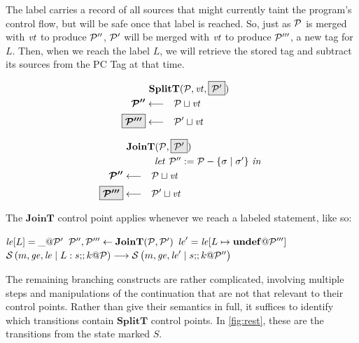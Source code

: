 \documentclass{article}
\begin{document}
The label carries a record of all sources that might currently taint the program's
control flow, but will be safe once that label is reached. So, just as \(\mathcal{P}\) is merged with
\(\mathit{vt}\) to produce \(\mathcal{P}''\), \(\mathcal{P}'\) will be merged with \(\mathit{vt}\) to produce \(\mathcal{P}'''\), a new tag
for \(L\). Then, when we reach the label \(L\), we will retrieve the stored tag and subtract its
sources from the PC Tag at that time.

\begin{minipage}{.4\textwidth}
\[\begin{aligned}
\truledef{\splitt{\PCT}{\vt}{\optional{\(\PCT'\)}}}
\settag{\PCT''}{\PCT \sqcup \vt}
\settag{\optional{\(\PCT'''\)}}{\PCT' \sqcup \vt}
\end{aligned}\]
\end{minipage}
\begin{minipage}{.4\textwidth}
\[\begin{aligned}
\truledef{\joint{\PCT}{\optional{\(\PCT'\)}}}
\letin{\PCT'' := \PCT - \{\sigma \mid \sigma'\}}
\settag{\PCT''}{\PCT \sqcup \vt}
\settag{\optional{\(\PCT'''\)}}{\PCT' \sqcup \vt}
\end{aligned}\]
\end{minipage}

The \(\mathbf{JoinT}\) control point applies whenever we reach a labeled statement, like so:

\judgmentthree
    {\(\mathit{le}[L] = \mathit{\_} @ \mathcal{P}'\)}
    {\(\mathcal{P}'',\mathcal{P}''' \leftarrow \mathbf{JoinT}(\mathcal{P},\mathcal{P}') \)}
    {\(\mathit{le}' = \mathit{le}[L \mapsto \mathit{\mathbf{undef}} @ \mathcal{P}''']\)}
    {\(\mathcal{S}\left(m,\mathit{ge},\mathit{le} \mid L: s ;\!; k @ \mathcal{P}\right) \longrightarrow
      \mathcal{S}\left(m,\mathit{ge},\mathit{le}' \mid s ;\!; k @ \mathcal{P}''\right)\)}

The remaining branching constructs are rather complicated, involving multiple steps
and manipulations of the continuation that are not that relevant to their control
points. Rather than give their semantics in full, it suffices to identify which
transitions contain \(\mathbf{SplitT}\) control points. In \cref{fig:rest}, these
are the transitions from the state marked \(S\).
\end{document}

